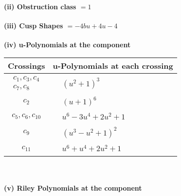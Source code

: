 \documentclass[1p]{elsarticle_modified}
\theoremstyle{definition}
\begin{document}
\flushleft \textbf{(ii) Obstruction class $= 1$}\\~\\
\flushleft \textbf{(iii) Cusp Shapes $= -4 b u+4 u-4$}\\~\\
\newpage\renewcommand{\arraystretch}{1}
\flushleft \textbf{(iv) u-Polynomials at the component}\newline \\
\begin{tabular}{m{50pt}|m{274pt}}
Crossings & \hspace{64pt}u-Polynomials at each crossing \\
\hline $$\begin{aligned}c_{1},c_{3},c_{4}\\c_{7},c_{8}\end{aligned}$$&$\begin{aligned}
&(u^2+1)^3
\end{aligned}$\\
\hline $$\begin{aligned}c_{2}\end{aligned}$$&$\begin{aligned}
&(u+1)^6
\end{aligned}$\\
\hline $$\begin{aligned}c_{5},c_{6},c_{10}\end{aligned}$$&$\begin{aligned}
&u^6-3 u^4+2 u^2+1
\end{aligned}$\\
\hline $$\begin{aligned}c_{9}\end{aligned}$$&$\begin{aligned}
&(u^3- u^2+1)^2
\end{aligned}$\\
\hline $$\begin{aligned}c_{11}\end{aligned}$$&$\begin{aligned}
&u^6+u^4+2 u^2+1
\end{aligned}$\\
\hline
\end{tabular}\\~\\
\newpage\renewcommand{\arraystretch}{1}
\flushleft \textbf{(v) Riley Polynomials at the component}\newline \\
\end{document}
